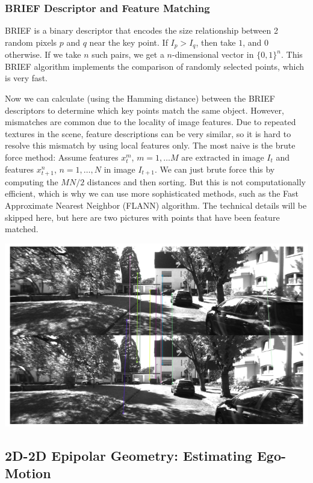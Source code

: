 \documentclass{article}
\theoremstyle{definition}
\theoremstyle{remark}
\theoremstyle{definition}
\begin{document}
\subsubsection{BRIEF Descriptor and Feature Matching}
BRIEF is a binary descriptor that encodes the size relationship between 2 random pixels $p$ and $q$ near the key point. If $I_p > I_q$, then take $1$, and $0$ otherwise. If we take $n$ such pairs, we get a $n$-dimensional vector in $\{0, 1\}^n$. This BRIEF algorithm implements the comparison of randomly selected points, which is very fast. 

Now we can calculate (using the Hamming distance) between the BRIEF descriptors to determine which key points match the same object. However, mismatches are common due to the locality of image features. Due to repeated textures in the scene, feature descriptions can be very similar, so it is hard to resolve this mismatch by using local features only. The most naive is the brute force method: Assume features $x_t^m$, $m =1, \ldots M$ are extracted in image $I_t$ and features $x_{t+1}^n$, $n = 1, \ldots, N$ in image $I_{t+1}$. We can just brute force this by computing the $M N / 2$ distances and then sorting. But this is not computationally efficient, which is why we can use more sophisticated methods, such as the Fast Approximate Nearest Neighbor (FLANN) algorithm. The technical details will be skipped here, but here are two pictures with points that have been feature matched. 
\begin{center}
    \includegraphics[scale=0.4]{img/feature_matching.png}
\end{center}

\subsection{2D-2D Epipolar Geometry: Estimating Ego-Motion}
\end{document}
